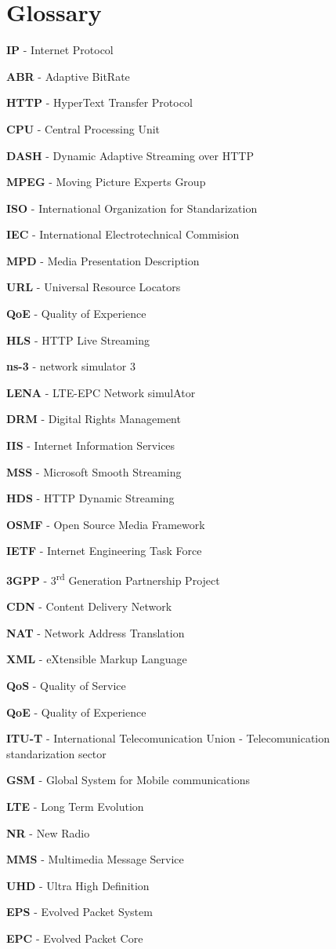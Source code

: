 \cleardoublepage
{}
\chapter*{Glossary}


\textbf{IP} - Internet Protocol

\textbf{ABR} - Adaptive BitRate

\textbf{HTTP} - HyperText Transfer Protocol

\textbf{CPU} - Central Processing Unit

\textbf{DASH} - Dynamic Adaptive Streaming over HTTP

\textbf{MPEG} - Moving Picture Experts Group

\textbf{ISO} - International Organization for Standarization

\textbf{IEC} - International Electrotechnical Commision

\textbf{MPD} - Media Presentation Description

\textbf{URL} - Universal Resource Locators

\textbf{QoE} - Quality of Experience

\textbf{HLS} - HTTP Live Streaming

\textbf{ns-3} - network simulator 3

\textbf{LENA} - LTE-EPC Network simulAtor

\textbf{DRM} - Digital Rights Management

\textbf{IIS} - Internet Information Services

\textbf{MSS} - Microsoft Smooth Streaming

\textbf{HDS} - HTTP Dynamic Streaming

\textbf{OSMF} - Open Source Media Framework

\textbf{IETF} - Internet Engineering Task Force

\textbf{3GPP} - 3\textsuperscript{rd} Generation Partnership Project

\textbf{CDN} - Content Delivery Network

\textbf{NAT} - Network Address Translation

\textbf{XML} - eXtensible Markup Language

\textbf{QoS} - Quality of Service

\textbf{QoE} - Quality of Experience

\textbf{ITU-T} - International Telecomunication Union - Telecomunication standarization sector

\textbf{GSM} - Global System for Mobile communications

\textbf{LTE} - Long Term Evolution

\textbf{NR} - New Radio

\textbf{MMS} - Multimedia Message Service

\textbf{UHD} - Ultra High Definition

\textbf{EPS} - Evolved Packet System

\textbf{EPC} - Evolved Packet Core

\cleardoublepage
